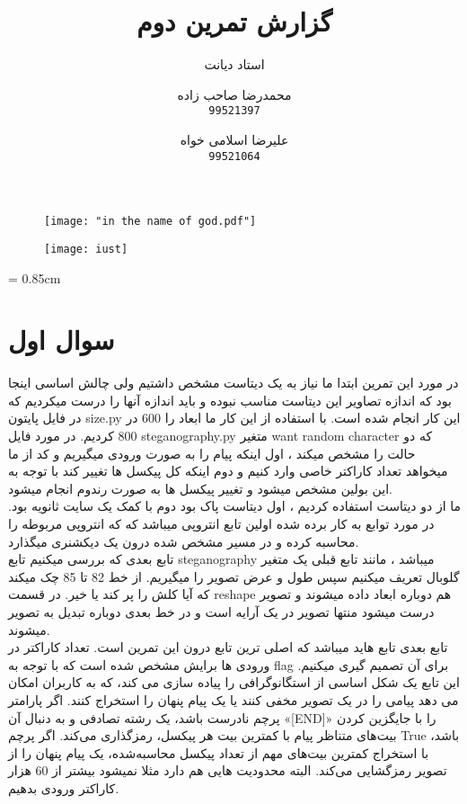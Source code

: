\documentclass{report}
\title{گزارش تمرین دوم }
\author{
    استاد دیانت
    \and
    محمدرضا صاحب زاده
    \\
    \texttt{99521397}
    \and 
    علیرضا اسلامی خواه
    \\
    \texttt{99521064}
    }
\begin{document}
\begin{figure}
    \centering
    \texttt{[image: "in the name of god.pdf"]}
    \vspace*{0.5cm}
\end{figure}
\begin{figure}
    \centering
    \texttt{[image: iust]}
\end{figure}

\maketitle
\tableofcontents
\baselineskip = 0.85cm







\chapter{سوال اول  }
در مورد این تمرین ابتدا ما نیاز به یک دیتاست مشخص داشتیم ولی چالش اساسی اینجا بود که اندازه تصاویر این دیتاست مناسب نبوده و باید اندازه آنها را درست میکردیم که در فایل پایتون size.py  این کار انجام شده است. با استفاده از این کار ما ابعاد را 600 در 800 کردیم. 
در مورد فایل steganography.py متغیر want random character که دو حالت را مشخص میکند ، اول اینکه پیام را به صورت ورودی میگیریم و کد از ما میخواهد تعداد کاراکتر خاصی وارد کنیم و دوم اینکه کل پیکسل ها تغییر کند با توجه به این بولین مشخص میشود و تغییر پیکسل ها به صورت رندوم انجام میشود. \\
ما از دو دیتاست استفاده کردیم ، اول دیتاست پاک بود دوم با کمک یک سایت ثانویه بود. در مورد توابع به کار برده شده اولین تابع انتروپی میباشد که که انتروپی مربوطه را محاسبه کرده و در مسیر مشخص شده درون یک دیکشنری میگذارد. \\
تابع بعدی که بررسی میکنیم تابع steganography میباشد ، مانند تابع قبلی یک متغیر گلوبال تعریف میکنیم سپس طول و عرض تصویر را میگیریم. از خط 82 تا 85 چک میکند که آیا کلش را پر کند یا خیر. در قسمت reshape هم دوباره ابعاد داده میشوند و تصویر درست میشود منتها تصویر در یک آرایه است و در خط بعدی دوباره تبدیل به تصویر میشوند. \\
تابع بعدی تابع هاید میباشد که اصلی ترین تابع درون این تمرین است. تعداد کاراکتر در ورودی ها برایش مشخص شده است که با توجه به flag برای آن تصمیم گیری میکنیم. این تابع یک شکل اساسی از استگانوگرافی را پیاده سازی می کند، که به کاربران امکان می دهد پیامی را در یک تصویر مخفی کنند یا یک پیام پنهان را استخراج کنند. اگر پارامتر پرچم نادرست باشد، یک رشته تصادفی و به دنبال آن «[END]» را با جایگزین کردن بیت‌های متناظر پیام با کمترین بیت هر پیکسل، رمزگذاری می‌کند. اگر پرچم True باشد، با استخراج کمترین بیت‌های مهم از تعداد پیکسل محاسبه‌شده، یک پیام پنهان را از تصویر رمزگشایی می‌کند. البته محدودیت هایی هم دارد مثلا نمیشود بیشتر از 60 هزار کاراکتر ورودی بدهیم. \\
\end{document}
